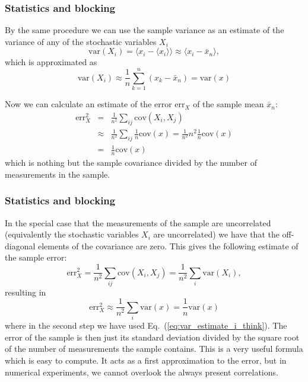 \documentclass{beamer}
\begin{document}
\begin{frame}
\frametitle{Statistics and blocking}

\begin{block}{}
By the same procedure we can use the sample variance as an
estimate of the variance of any of the stochastic variables $X_i$
\[
\mathrm{var}(X_i)=\langle x_i - \langle x_i\rangle\rangle \approx \langle x_i - \bar x_n\rangle\nonumber,
\]
which is approximated as 
\begin{equation}
\mathrm{var}(X_i)\approx \frac{1}{n}\sum_{k=1}^n (x_k - \bar x_n)=\mathrm{var}(x)
\label{eq:var_estimate_i_think}
\end{equation}

Now we can calculate an estimate of the error
$\mathrm{err}_X^{\phantom X}$ of the sample mean $\bar x_n$:
\begin{eqnarray}
\mathrm{err}_X^2
&=&\frac{1}{n^2}\sum_{ij} \mathrm{cov}(X_i, X_j) \nonumber \\
&\approx&\frac{1}{n^2}\sum_{ij}\frac{1}{n}\mathrm{cov}(x) =\frac{1}{n^2}n^2\frac{1}{n}\mathrm{cov}(x)\nonumber\\
&=&\frac{1}{n}\mathrm{cov}(x)
\label{eq:error_estimate}
\end{eqnarray}
which is nothing but the sample covariance divided by the number of
measurements in the sample.
\end{block}
\end{frame}

\begin{frame}
\frametitle{Statistics and blocking}

\begin{block}{}

In the special case that the measurements of the sample are
uncorrelated (equivalently the stochastic variables $X_i$ are
uncorrelated) we have that the off-diagonal elements of the covariance
are zero. This gives the following estimate of the sample error:
\[
\mathrm{err}_X^2=\frac{1}{n^2}\sum_{ij} \mathrm{cov}(X_i, X_j) =
\frac{1}{n^2} \sum_i \mathrm{var}(X_i),
\]
resulting in
\begin{equation}
\mathrm{err}_X^2\approx \frac{1}{n^2} \sum_i \mathrm{var}(x)= \frac{1}{n}\mathrm{var}(x)
\label{eq:error_estimate_uncorrel}
\end{equation}
where in the second step we have used Eq.~(\ref{eq:var_estimate_i_think}).
The error of the sample is then just its standard deviation divided by
the square root of the number of measurements the sample contains.
This is a very useful formula which is easy to compute. It acts as a
first approximation to the error, but in numerical experiments, we
cannot overlook the always present correlations.
\end{block}
\end{frame}
\end{document}
